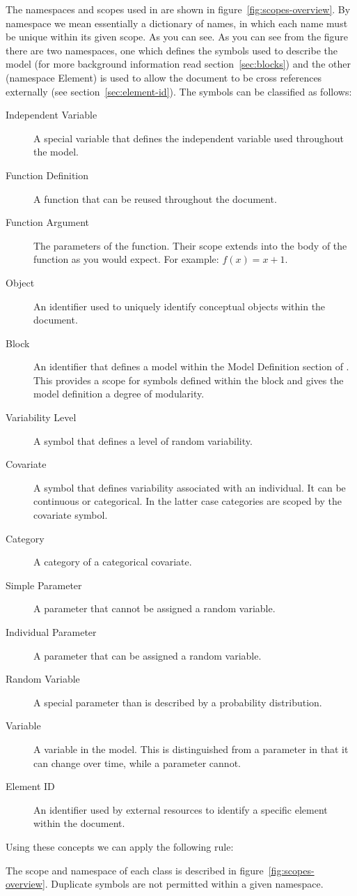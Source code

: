 The namespaces and scopes used in \pharmml are shown in
figure~\ref{fig:scopes-overview}. By namespace we mean essentially a
dictionary of names, in which each name must be unique within its
given scope. As you can see. As you can see from the figure there are
two namespaces, one which defines the symbols used to describe the
model (for more background information read section~\ref{sec:blocks})
and the other (namespace Element) is used to allow the \pharmml
document to be cross references externally (see
section~\ref{sec:element-id}).  The symbols can be classified as
follows:
\begin{description}
\item[Independent Variable] A special variable that defines the
  independent variable used throughout the model.
\item[Function Definition] A function that can be reused throughout
  the \pharmml document.
\item[Function Argument] The parameters of the function. Their scope
  extends into the body of the function as you would expect. For
  example: $f(x) = x + 1$.
\item[Object] An identifier used to uniquely identify conceptual
  objects within the \pharmml document.
\item[Block] An identifier that defines a model within the Model
  Definition section of \pharmml. This provides a scope for symbols
  defined within the block and gives the model definition a degree of
  modularity.
\item[Variability Level] A symbol that defines a level of random
  variability.
\item[Covariate] A symbol that defines variability associated with an
  individual. It can be continuous or categorical. In the latter case
  categories are scoped by the covariate symbol.
\item[Category] A category of a categorical covariate.
\item[Simple Parameter] A parameter that cannot be assigned a random variable.
\item[Individual Parameter] A parameter that can be assigned a random
  variable.
\item[Random Variable] A special parameter than is described by a
  probability distribution.
\item[Variable] A variable in the model. This is distinguished from a
  parameter in that it can change over time, while a parameter cannot.
\item[Element ID] An identifier used by external resources to identify
  a specific element within the \pharmml document.
\end{description}
%
Using these concepts we can apply the following rule:
%
\begin{valrules}
 The
scope and namespace of each class is described in figure~\ref{fig:scopes-overview}.
   Duplicate
  symbols are not permitted within a given namespace.
\end{valrules}

